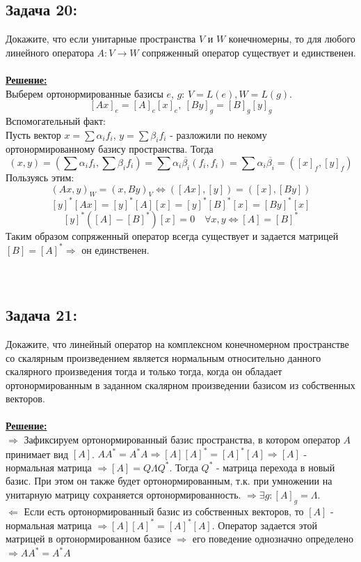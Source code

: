 \documentclass[a4paper,12pt,titlepage,final]{article}
\begin{document}
\subsection*{Задача 20:}
\noindent Докажите, что если унитарные пространства $V$ и $W$ конечномерны, то для любого линейного оператора $A: V \to W$ сопряженный оператор существует и единственен.\\ \\
\textbf{\underline{Решение:}} \\
Выберем ортонормированные базисы $e$, $g$: $V = L(e), W = L(g)$.
$$[Ax]_e = [A]_e[x]_e, \: [By]_g = [B]_g[y]_g$$
Вспомогательный факт: \\
Пусть вектор $x = \sum\alpha_i f_i$, $y = \sum\beta_i f_i$  - разложили по некому ортонормированному базису пространства. Тогда
$$(x, y) = (\sum\alpha_i f_i, \sum\beta_i f_i) = \sum\alpha_i\overline{\beta_i}(f_i, f_i) = \sum\alpha_i\overline{\beta_i} = ([x]_f, [y]_f)$$
Пользуясь этим:
$$(Ax, y)_W = (x, By)_V \Leftrightarrow ([Ax], [y]) = ([x], [By])$$
$$[y]^*[Ax] = [y]^*[A][x] = [y]^*[B]^*[x] = [By]^*[x]$$
$$[y]^*([A] - [B]^*)[x] = 0 \quad \forall x, y \Leftrightarrow [A] = [B]^*$$
Таким образом сопряженный оператор всегда существует и задается матрицей $[B] = [A]^* \Rightarrow$ он единственен. \blacksquare \\ \\ \\

\subsection*{Задача 21:}
\noindent Докажите, что линейный оператор на комплексном конечномерном пространстве со скалярным произведением является
нормальным относительно данного скалярного произведения тогда и только тогда, когда он обладает ортонормированным в заданном скалярном произведении 
базисом из собственных векторов.\\ \\
\textbf{\underline{Решение:}} \\
$\boldsymbol{\Rightarrow}$ Зафиксируем ортонормированный базис пространства, в котором оператор $A$ принимает вид $[A]$.
$AA^* = A^*A \Rightarrow [A][A]^* = [A]^*[A] \Rightarrow [A]$ - нормальная матрица $\Rightarrow [A] = Q\Lambda Q^*$. Тогда $Q^*$ - матрица перехода в новый базис. При этом он 
также будет ортонормированным, т.к. при умножении на унитарную матрицу сохраняется ортонормированность. $\Rightarrow \exists g: [A]_g = \Lambda$. \\
$\boldsymbol{\Leftarrow}$ Если есть ортонормированный базис из собственных векторов, то $[A]$ - нормальная матрица $\Rightarrow [A][A]^* = [A]^*[A]$.
Оператор задается этой матрицей в ортонормированном базисе $\Rightarrow$ его поведение однозначно определено $\Rightarrow AA^* = A^*A$ \blacksquare \\ \\ \\
\end{document}
